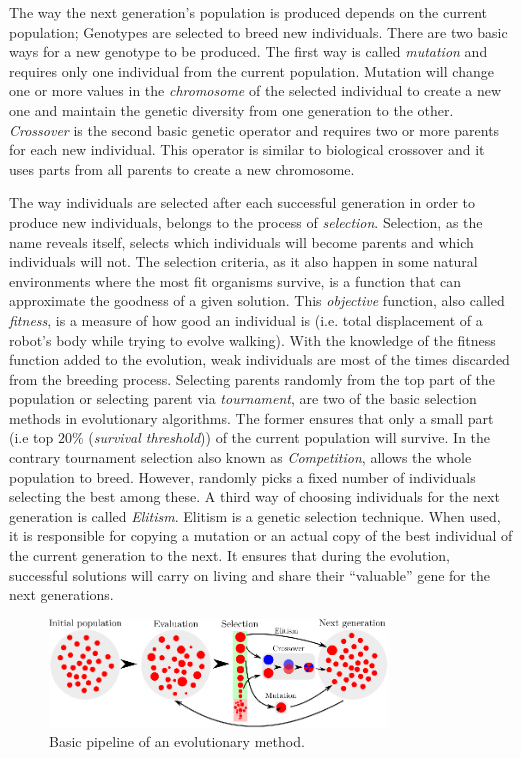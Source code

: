 The way the next generation's population is produced depends on the current population; Genotypes are selected to breed new individuals. There are two basic ways for a new genotype to be produced. The first way is called \emph{mutation} and requires only one individual from the current population. Mutation will change one or more values in the \emph{chromosome} of the selected individual to create a new one and maintain the genetic diversity from one generation to the other. \emph{Crossover} is the second basic genetic operator and requires two or more parents for each new individual. This operator is similar to biological crossover and it uses parts from all parents to create a new chromosome. 


The way individuals are selected after each successful generation in order to produce new individuals, belongs to the process of \emph{selection}. Selection, as the name reveals itself, selects which individuals will become parents and which individuals will not. The selection criteria, as it also happen in some natural environments where the most fit organisms survive, is a function that can approximate the goodness of a given solution. This \emph{objective} function, also called \emph{fitness}, is a measure of how good an individual is (i.e. total displacement of a robot's body while trying to evolve walking). With the knowledge of the fitness function added to the evolution, weak individuals are most of the times discarded from the breeding process. Selecting parents randomly from the top part of the population or selecting parent via \emph{tournament}, are two of the basic selection methods in evolutionary algorithms. The former ensures that only a small part (i.e top $20\%$ ({\it survival threshold})) of the current population will survive. In the contrary tournament selection also known as \emph{Competition}, allows the whole population to breed. However, randomly picks a fixed number of individuals selecting the best among these. A third way of choosing individuals for the next generation is called \emph{Elitism}. Elitism is a genetic selection technique. When used, it is responsible for copying a mutation or an actual copy of the best individual of the current generation to the next. It ensures that during the evolution, successful solutions will carry on living and share their ``valuable'' gene for the next generations.

\begin{figure}[t!]
\vspace{0.4cm} %
\centering
\includegraphics[width=0.8\textwidth]{../Figures/Misc/Evolution.eps}
\caption{Basic pipeline of an evolutionary method.}
\label{fig:evolutionPipeline}
\end{figure}


